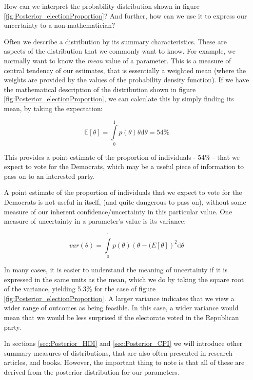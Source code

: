 \documentclass[11pt,fullpage]{book}
\begin{document}
How can we interpret the probability distribution shown in figure \ref{fig:Posterior_electionProportion}? And further, how can we use it to express our uncertainty to a non-mathematician? 

Often we describe a distribution by its summary characteristics. These are aspects of the distribution that we commonly want to know. For example, we normally want to know the \textit{mean} value of a parameter. This is a measure of central tendency of our estimates, that is essentially a weighted mean (where the weights are provided by the values of the probability density function). If we have the mathematical description of the distribution shown in figure \ref{fig:Posterior_electionProportion}, we can calculate this by simply finding its mean, by taking the expectation:

\begin{equation}
\mathbb{E}[\theta] = \int\limits_{0}^{1} p(\theta)\theta \mathrm{d}\theta = 54\%
\end{equation}

This provides a point estimate of the proportion of individuals - 54\% - that we expect to vote for the Democrats, which may be a useful piece of information to pass on to an interested party. 

A point estimate of the proportion of individuals that we expect to vote for the Democrats is not useful in itself, (and quite dangerous to pass on), without some measure of our inherent confidence/uncertainty in this particular value. One measure of uncertainty in a parameter's value is its variance:

\begin{equation}
var(\theta)=  \int\limits_{0}^{1} p(\theta)(\theta-\mathbb(E[\theta])^2 \mathrm{d}\theta
\end{equation}

In many cases, it is easier to understand the meaning of uncertainty if it is expressed in the same units as the mean, which we do by taking the square root of the variance, yielding 5.3\% for the case of figure \ref{fig:Posterior_electionProportion}. A larger variance indicates that we view a wider range of outcomes as being feasible. In this case, a wider variance would mean that we would be less surprised if the electorate voted in the Republican party. 

In sections \ref{sec:Posterior_HDI} and \ref{sec:Posterior_CPI} we will introduce other summary measures of distributions, that are also often presented in research articles, and books. However, the important thing to note is that all of these are derived from the posterior distribution for our parameters. 
\end{document}
